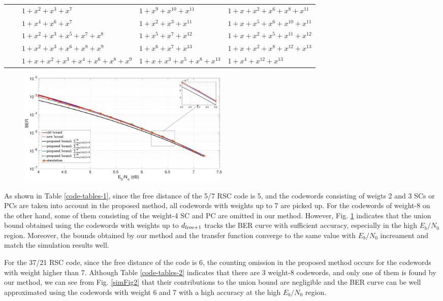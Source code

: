\begin{table}[htbp]
\begin{tabularx}{0.48\textwidth}{|c|c|XXX}
			&&$1+x^2+x^3+x^7$ 						& $1+x^9+x^{10}+x^{11}$ 			& $1+x+x^{2}+x^{6}+x^8+x^{11}$\\
			&&$1+x^4+x^6+x^7$ 						& $1+x^2+x^3+x^{11}$ 				& $1+x+x^{5}+x^6+x^{10}+x^{11}$\\
			&&$1+x^2+x^3+x^5+x^7+x^8$ 			& $1+x^5+x^7+x^{12}$ 				& $1+x+x^{2}+x^5+x^{11}+x^{12}$\\
			&&$1+x^2+x^3+x^6+x^8+x^9$ 			& $1+x^6+x^7+x^{13}$ 				& $1+x+x^2+x^8+x^{12}+x^{13}$\\
			&&$1+x+x^2+x^3+x^4+x^6+x^8+x^9$ 	& $1+x+x^3+x^5+x^8+x^{13}$ 		& $1+x^{4}+x^{12}+x^{13}$\\
			\bottomrule
		\end{tabularx}		
		\label{code-tables-3}
	\end{table}



\begin{figure}[htbp]
	\centering
	\includegraphics[width=0.5\textwidth]{./Images/RSC_5_7_lower_weights3.eps}
	\label{simFig1}
\end{figure}

As shown in Table \ref{code-tables-1}, since the free distance of the 5/7 RSC code is 5, and the codewords consisting of weigts 2 and 3 SCs or PCs are taken into account in the proposed method, all codewords with weights up to 7 are picked up. For the codewords of weight-8 on the other hand, some of them consisting of the weight-4 SC and PC are omitted in our method. However, Fig. \ref{simFig1} indicates that the union bound obtained using the codewords with weights up to $d_{\rm free+1}$ tracks the BER curve with sufficient accuracy, especially in the high $E_b/N_0$ region. Moreover, the bounds obtained by our method and the transfer function converge to the same value with $E_b/N_0$ increament and match the simulation results well. 

For the 37/21 RSC code, since the free distance of the code is 6, the counting omission in the proposed method occurs for the codewords with weight higher than 7. Although Table \ref{code-tables-2} indicates that there are 3 weight-8 codewords, and only one of them is found by our method, we can see from Fig. \ref{simFig2} that their contributions to the union bound are negligible and the BER curve can be well approximated using the codewords with weight 6 and 7 with a high accuracy at the high $E_b/N_0$ region.

